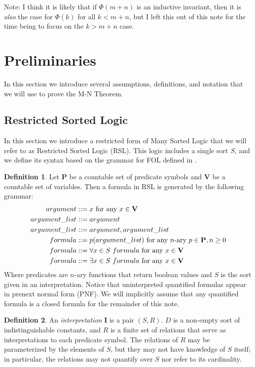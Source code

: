 \documentclass[12pt]{article}
\theoremstyle{definition}
\newtheorem{definition}{Definition}
\theoremstyle{remark}
\newcommand{\msp}{\text{ }}
\begin{document}
Note: I think it is likely that if $\Phi(m+n)$ is an inductive invariant, then it is \textit{also} the case for $\Phi(k)$ for all $k<m+n$, but I left this out of this note for the time being to focus on the $k>m+n$ case.



\section{Preliminaries}
In this section we introduce several assumptions, definitions, and notation that we will use to prove the M-N Theorem.


\subsection{Restricted Sorted Logic}
In this section we introduce a restricted form of Many Sorted Logic that we will refer to as Restricted Sorted Logic (RSL).  This logic includes a single sort $S$, and we define its syntax based on the grammar for FOL defined in \cite{ben-ari}.

\begin{definition}
  Let $\mathbf{P}$ be a countable set of predicate symbols and $\mathbf{V}$ be a countable set of variables.  Then a formula in RSL is generated by the following grammar:
  \begin{align*}
    argument &::= x \hfill \text{ for any } x \in \mathbf{V}\\
    argument\_list &::= argument\\
    argument\_list &::= argument,argument\_list\\
    formula &::= p(argument\_list) \hfill \text{ for any } n\text{-ary } p \in \mathbf{P}, n \geq 0\\
    formula &::= \forall x \in S \msp formula \hfill \text{ for any } x \in \mathbf{V}\\
    formula &::= \exists x \in S \msp formula \hfill \text{ for any } x \in \mathbf{V}\\
  \end{align*}
  Where predicates are $n$-ary functions that return boolean values and $S$ is the sort given in an interpretation.  Notice that uninterpreted quantified formulas appear in prenext normal form (PNF).  We will implicitly assume that any quantified formula is a closed formula for the remainder of this note.
\end{definition}

\begin{definition}
  An \textit{interpretation} $\mathbf{I}$ is a pair $(S, R)$.  $D$ is a non-empty sort of indistinguishable constants, and $R$ is a finite set of relations that serve as interpretations to each predicate symbol.  The relations of $R$ may be parameterized by the elements of $S$, but they may not have knowledge of $S$ itself; in particular, the relations may not quantify over $S$ nor refer to its cardinality.
\end{definition}
\end{document}
